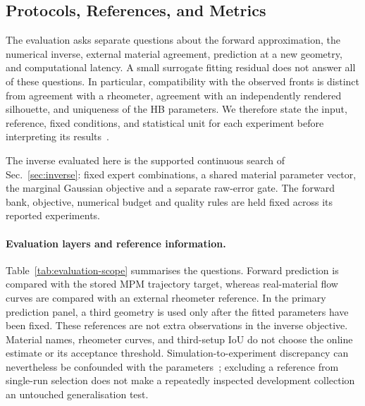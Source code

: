 \subsection{Protocols, References, and Metrics}
\label{sec:experimental-setup}

The evaluation asks separate questions about the forward approximation,
the numerical inverse, external material agreement, prediction at a new
geometry, and computational latency. A small surrogate fitting residual
does not answer all of these questions. In particular, compatibility
with the observed fronts is distinct from agreement with a rheometer,
agreement with an independently rendered silhouette, and uniqueness of
the HB parameters. We therefore state the input, reference, fixed
conditions, and statistical unit for each experiment before interpreting
its results~\cite{bastos2009diagnostics,bayarri2007framework}.

The inverse evaluated here is the supported continuous search of
Sec.~\ref{sec:inverse}: fixed expert combinations, a shared material
parameter vector, the marginal Gaussian objective and a separate
raw-error gate. The forward bank, objective, numerical budget and
quality rules are held fixed across its reported experiments.

\paragraph{Evaluation layers and reference information.}
Table~\ref{tab:evaluation-scope} summarises the questions. Forward
prediction is compared with the stored MPM trajectory target, whereas
real-material flow curves are compared with an external rheometer
reference. In the primary prediction panel, a third geometry is used only after the fitted parameters
have been fixed. These references are not extra observations in the
inverse objective. Material names, rheometer curves, and third-setup
IoU do not choose the online estimate or its acceptance threshold.
Simulation-to-experiment discrepancy can nevertheless be confounded
with the parameters~\cite{kennedy2001bayesian}; excluding a reference
from single-run selection does not make a repeatedly inspected
development collection an untouched generalisation test.

